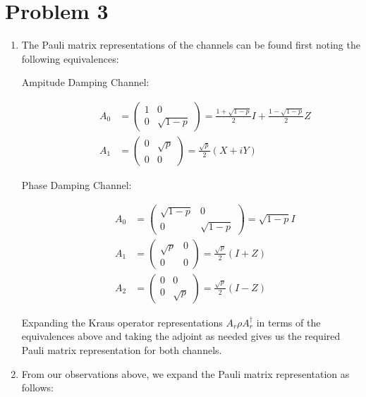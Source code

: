 \documentclass[12pt]{article}%
\begin{document}
\section*{Problem 3}
\begin{enumerate}
	\item The Pauli matrix representations of the channels can be found first noting the following equivalences:
		\begin{description}
			\item[Ampitude Damping Channel: ] 
				\begin{align*}
					\label{eq:}
					A_0 & = \left(\begin{matrix} 1 & 0 \\ 0 & \sqrt{1-p} \end{matrix}\right) = \frac{1 + \sqrt{1 - p}}{2}I + \frac{1 - \sqrt{1-p}}{2} Z \\
					A_1 & = \left(\begin{matrix} 0 &  \sqrt{p} \\ 0 & 0  \end{matrix} \right) = \frac{\sqrt{p}}{2} \left(X + iY \right)   
				\end{align*}
			\item[Phase Damping Channel:] 
				\begin{align*}
					A_0 & = \left(\begin{matrix} \sqrt{1-p} & 0 \\ 0 & \sqrt{1-p} \end{matrix}\right) = \sqrt{1-p}I \\
					A_1 & = \left(\begin{matrix} \sqrt{p} & 0 \\ 0 & 0 \end{matrix}\right) = \frac{\sqrt{p}}{2} (I + Z) \\
					A_2 & = \left(\begin{matrix} 0 & 0 \\ 0 & \sqrt{p} \end{matrix}\right) = \frac{\sqrt{p}}{2} (I- Z) 
				\end{align*}
		\end{description}
		Expanding the Kraus operator representations \(A_r \rho A_r^{\dagger} \) in terms of the equivalences above and taking the adjoint as needed gives us the required Pauli matrix representation for both channels.
	\item From our observations above, we expand the Pauli matrix representation as follows:
		\begin{align*}

\end{align*}
\end{enumerate}
\end{document}
